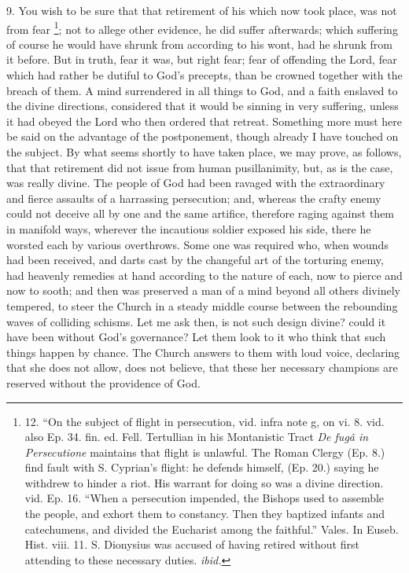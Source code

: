 9. You wish to be sure that
that retirement of his which now took place, was not from fear \footnote{12. ``On
the subject of flight in persecution, vid. infra note g, on vi. 8. vid.
also Ep. 34. fin. ed. Fell. Tertullian in his Montanistic Tract \emph{De
fugâ in} \emph{Persecutione} maintains that flight is unlawful.
The Roman Clergy (Ep. 8.) find fault with S. Cyprian's flight: he
defends himself, (Ep. 20.) saying he withdrew to hinder a riot. His
warrant for doing so was a divine direction. vid. Ep. 16. ``When a
persecution impended, the Bishops used to assemble the people, and
exhort them to constancy. Then they baptized infants and catechumens,
and divided the Eucharist among the faithful.'' Vales. In Euseb. Hist.
viii. 11. S. Dionysius was accused of having retired without first
attending to these necessary duties. \emph{ibid.}}; not to allege other evidence, he did suffer afterwards;
which suffering of course he would have shrunk from according to his
wont, had he shrunk from it before. But in truth, fear it was, but
right fear; fear of offending the Lord, fear which had rather be
dutiful to God's precepts, than be crowned together with the breach of
them. A mind surrendered in all things to God, and a faith enslaved to
the divine directions, considered that it would be sinning in very
suffering, unless it had obeyed the Lord who then ordered that
retreat. Something more must here be said on the advantage of the
postponement, though already I have touched on the subject. By what
seems shortly to have taken place, we may prove, as follows, that that
retirement did not issue from human pusillanimity, but, as is the
case, was really divine. The people of God had been ravaged with the
extraordinary and fierce assaults of a harrassing persecution; and,
whereas the crafty enemy could not deceive all by one and the same
artifice, therefore raging against them in manifold ways, wherever the
incautious soldier exposed his side, there he worsted each by various
overthrows. Some one was required who, when wounds had been received,
and darts cast by the changeful art of the torturing enemy, had
heavenly remedies at hand according to the nature of each, now to
pierce and now to sooth; and then was preserved a man of a mind beyond
all others divinely tempered, to steer the Church in a steady middle
course between the rebounding waves of colliding schisms. Let me ask
then, is not such design divine? could it have been without God's
governance? Let them look to it who think that such things happen by
chance. The Church answers to them with loud voice, declaring that she
does not allow, does not believe, that these her necessary champions
are reserved without the providence of God.

